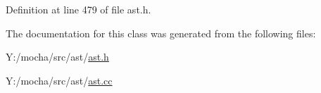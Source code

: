 Definition at line 479 of file ast.h.



The documentation for this class was generated from the following files:\begin{DoxyCompactItemize}
\item 
Y:/mocha/src/ast/\hyperlink{ast_8h}{ast.h}\item 
Y:/mocha/src/ast/\hyperlink{ast_8cc}{ast.cc}\end{DoxyCompactItemize}
